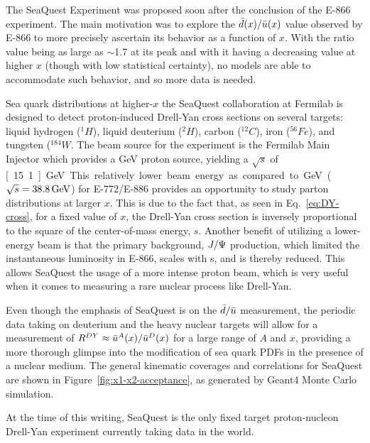 The SeaQuest Experiment was proposed soon after the conclusion of the E-866 experiment. The main motivation was to explore the $\bar{d}(x)/\bar{u}(x)$ value observed by E-866 to more precisely ascertain its behavior as a function of $x$. With the ratio value being as large as $\sim$1.7 at its peak and with it having a decreasing value at higher $x$ (though with low statistical certainty), no models are able to accommodate such behavior, and so more data is needed. 

Sea quark distributions at higher-$x$ the SeaQuest collaboration at Fermilab is designed to detect proton-induced Drell-Yan cross sections on several targets: liquid hydrogen ($^1H$), liquid deuterium ($^2H$), carbon ($^{12}C$), iron ($^{56}Fe$), and tungsten ($^{184}W$. The beam source for the experiment is the Fermilab Main Injector which provides a \unit[120]{GeV} proton source, yielding a $\sqrt{s}$ of \unit[15.1]{GeV}. This relatively lower beam energy as compared to \unit[800]{GeV} ($\sqrt{s}=\unit[38.8]{GeV}$) for E-772/E-886 provides an opportunity to study parton distributions at larger $x$. This is due to the fact that, as seen in Eq.~\ref{eq:DY-cross}, for a fixed value of $x$, the Drell-Yan cross section is inversely proportional to the square of the center-of-mass energy, $s$. Another benefit of utilizing a lower-energy beam is that the primary background, $J/\Psi$ production, which limited the instantaneous luminosity in E-866, scales with s, and is thereby reduced. This allows SeaQuest the usage of a more intense proton beam, which is very useful when it comes to measuring a rare nuclear process like Drell-Yan.

Even though the emphasis of SeaQuest is on the $\bar{d}/\bar{u}$ measurement, the periodic data taking on deuterium and the heavy nuclear targets will allow for a measurement of $R^{DY}\approx\bar{u}^A(x)/\bar{u}^D(x)$ for a large range of $A$ and $x$, providing a more thorough glimpse into the modification of sea quark PDFs in the presence of a nuclear medium. The general kinematic coverages and correlations for SeaQuest are shown in Figure~\ref{fig:x1-x2-acceptance}, as generated by Geant4 Monte Carlo simulation.

At the time of this writing, SeaQuest is the only fixed target proton-nucleon Drell-Yan experiment currently taking data in the world.

